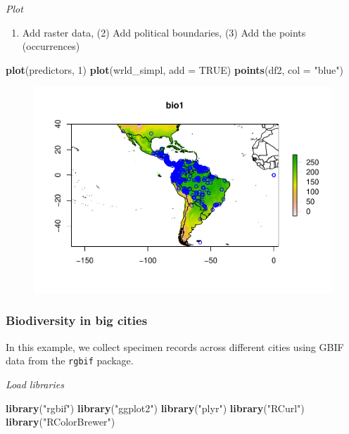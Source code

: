 \documentclass[author-year, review, 11pt]{components/elsarticle} %
\makeatletter
\newenvironment{Shaded}{\begin{snugshade}}{\end{snugshade}}
\newcommand{\KeywordTok}[1]{\textcolor[rgb]{0.13,0.29,0.53}{\textbf{{#1}}}}
\newcommand{\DataTypeTok}[1]{\textcolor[rgb]{0.13,0.29,0.53}{{#1}}}
\newcommand{\DecValTok}[1]{\textcolor[rgb]{0.00,0.00,0.81}{{#1}}}
\newcommand{\StringTok}[1]{\textcolor[rgb]{0.31,0.60,0.02}{{#1}}}
\newcommand{\OtherTok}[1]{\textcolor[rgb]{0.56,0.35,0.01}{{#1}}}
\newcommand{\NormalTok}[1]{{#1}}
\def\maxwidth{\ifdim\Gin@nat@width>\linewidth\linewidth
\else\Gin@nat@width\fi}
\let\Oldincludegraphics\includegraphics
\renewcommand{\includegraphics}[1]{\Oldincludegraphics[width=\maxwidth]{#1}}
\makeatother
\begin{document}
\emph{Plot}

\begin{enumerate}
\def\labelenumi{(\arabic{enumi})}
\itemsep1pt\parskip0pt
\item
  Add raster data, (2) Add political boundaries, (3) Add the points
  (occurrences)
\end{enumerate}

\begin{Shaded}
\begin{Highlighting}[]
\KeywordTok{plot}\NormalTok{(predictors, }\DecValTok{1}\NormalTok{)}
\KeywordTok{plot}\NormalTok{(wrld_simpl, }\DataTypeTok{add =} \OtherTok{TRUE}\NormalTok{)}
\KeywordTok{points}\NormalTok{(df2, }\DataTypeTok{col =} \StringTok{"blue"}\NormalTok{)}
\end{Highlighting}
\end{Shaded}

\begin{figure}[htbp]
\centering
\includegraphics{components/figure/manuscript-unnamed-chunk-25-1.pdf}
\caption{}
\end{figure}

\subsubsection{Biodiversity in big
cities}\label{biodiversity-in-big-cities}

In this example, we collect specimen records across different cities
using GBIF data from the \texttt{rgbif} package.

\emph{Load libraries}

\begin{Shaded}
\begin{Highlighting}[]
\KeywordTok{library}\NormalTok{(}\StringTok{"rgbif"}\NormalTok{)}
\KeywordTok{library}\NormalTok{(}\StringTok{"ggplot2"}\NormalTok{)}
\KeywordTok{library}\NormalTok{(}\StringTok{"plyr"}\NormalTok{)}
\KeywordTok{library}\NormalTok{(}\StringTok{"RCurl"}\NormalTok{)}
\KeywordTok{library}\NormalTok{(}\StringTok{"RColorBrewer"}\NormalTok{)}
\end{Highlighting}
\end{Shaded}
\end{document}

